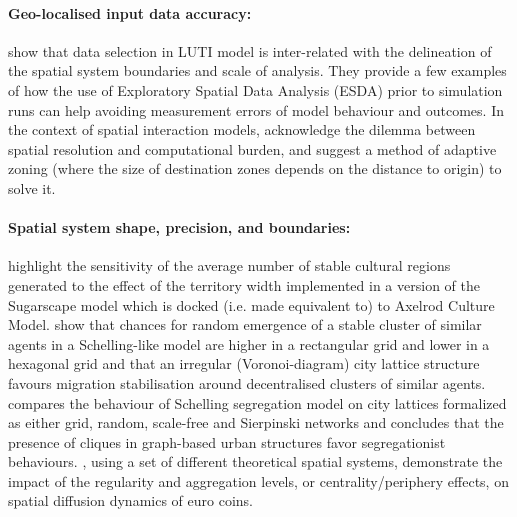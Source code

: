 \documentclass[Royal,sageh,times]{sagej}
\begin{document}
\paragraph{Geo-localised input data accuracy:} \citet{Thomasetal2017} show that data selection in LUTI model is inter-related with the delineation of the spatial system boundaries and scale of analysis. They provide a few examples of how the use of Exploratory Spatial Data Analysis (ESDA) prior to simulation runs can help avoiding measurement errors of model behaviour and outcomes. In the context of spatial interaction models, \citet{hagen2012new} acknowledge the dilemma between spatial resolution and computational burden, and suggest a method of adaptive zoning (where the size of destination zones depends on the distance to origin) to solve it.

\paragraph{Spatial system shape, precision, and boundaries:} \citet{Axtelletal1996} highlight the sensitivity of the average number of stable cultural regions generated to the effect of the territory width implemented in a version of the Sugarscape model which is docked (i.e. made equivalent to) to Axelrod Culture Model. \citet{FlacheHegselmann2001} show that chances for random emergence of a stable cluster of similar agents in a Schelling-like model are higher in a rectangular grid and lower in a hexagonal grid and that an irregular (Voronoi-diagram) city lattice structure favours migration stabilisation around decentralised clusters of similar agents. \citet{Banos2012} compares the behaviour of Schelling segregation model on city lattices formalized as either grid, random, scale-free and Sierpinski networks and concludes that the presence of cliques in graph-based urban structures favor segregationist behaviours. \citet{LeTexierCaruso2017}, using a set of different theoretical spatial systems, demonstrate the impact of the regularity and aggregation levels, or centrality/periphery effects, on spatial diffusion dynamics of euro coins. 
\end{document}
